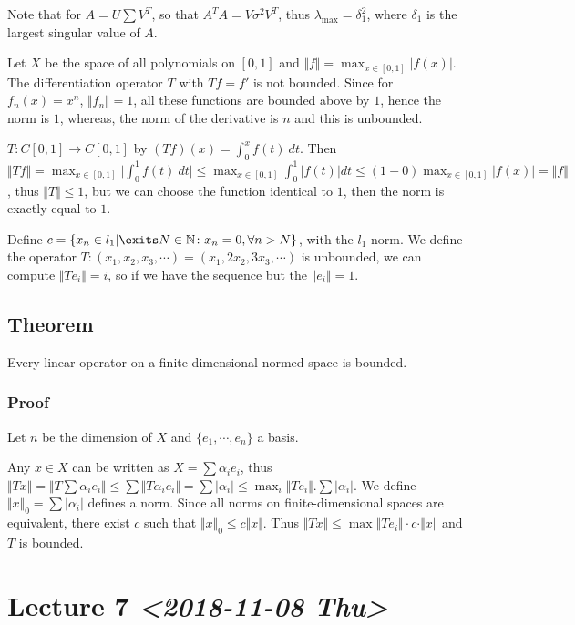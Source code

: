 \documentclass[11pt]{article}
\def\N{\mathbb{N}}
\begin{document}
Note that for \(A = U \sum V^T\), so that \(A^{T} A = V \sigma^2 V^{T}\), thus
\(\lambda_{\max} = \delta_{1}^2\), where \(\delta_1\) is the largest singular
value of \(A\).

Let \(X\) be the space of all polynomials on \([0, 1]\) and \(\Vert f \Vert =
   \max_{x \in [0, 1]} \vert f (x) \vert\). The differentiation operator \(T\) with
\(Tf = f'\) is not bounded. Since for \(f_n(x) = x^n\), \(\Vert f_n\Vert = 1\), all
these functions are bounded above by \(1\), hence the norm is \(1\), whereas, the
norm of the derivative is \(n\) and this is unbounded.

\(T \colon C[0, 1] \rightarrow C[0, 1]\) by \((Tf)(x) = \int_{0}^{x} f(t)\ dt\).
Then \(\Vert T f\Vert = \max_{x \in [0, 1]} \vert \int_{0}^{1} f(t)\ dt\vert
   \le \max_{x \in [0, 1]} \int_{0}^{1} \vert f(t) \vert dt \le (1-0) \max_{x\in
   [0, 1]} \vert f(x) \vert = \Vert f \Vert\), thus \(\Vert T \Vert \le 1\), but we
can choose the function identical to \(1\), then the norm is exactly equal to
\(1\).

Define \(c = \{x_n \in l_1 \vert \exits N \in \N\colon x_n = 0, \forall n >
   N\}\), with the \(l_1\) norm. We define the operator \(T\colon (x_1, x_2, x_3,
   \cdots) = (x_1, 2x_2, 3x_3, \cdots)\) is unbounded, we can compute \(\Vert T
   e_i \Vert = i\), so if we have the sequence but the \(\Vert e_i \Vert = 1\).
\subsection{Theorem}
\label{sec:org3e0da78}
Every linear operator on a finite dimensional normed space is bounded.
\subsubsection{Proof}
\label{sec:orgc31f30b}
Let \(n\) be the dimension of \(X\) and \(\{e_1, \cdots, e_n\}\) a basis.

Any \(x\in X\) can be written as \(X = \sum \alpha_i e_i\), thus \(\Vert Tx \Vert
    = \Vert T \sum \alpha_i e_i\Vert \le \sum \Vert T \alpha_i e_i\Vert = \sum
    \vert \alpha_i \vert \le \max_{i} \Vert T e_i \Vert . \sum \vert \alpha_i
    \vert\). We define \(\Vert x \Vert_0 = \sum \vert \alpha_i \vert\) defines a
norm. Since all norms on finite-dimensional spaces are equivalent, there
exist \(c\) such that \(\Vert x \Vert_0 \le c \Vert x \Vert\). Thus \(\Vert T
    x\Vert \le \max \Vert T e_i \Vert \cdot c \cdot \Vert x \Vert\) and \(T\) is
bounded.
\section{Lecture 7 \textit{<2018-11-08 Thu>}}
\label{sec:org985d2c1}
\end{document}

